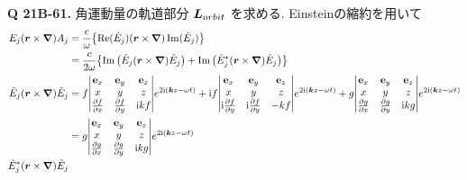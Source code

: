 \documentclass[uplatex,a4paper,dvipdfmx]{jsarticle}
\theoremstyle{definition}
\begin{document}
\textbf{Q 21B-61.}
角運動量の軌道部分 $\vb*{L}_{orbit}$ を求める. Einsteinの縮約を用いて
\begin{align}
  E_j(\rr\times\vnabla)A_j
                    & = \frac{c}{\omega}\qty{\Re(\Et_j)(\rr\times\vnabla)\Im(\Et_j)}                                                                                                                                                                                                                                       \\
                    & = \frac{c}{2\omega}\qty{\Im\qty(\Et_j(\rr\times\vnabla)\Et_j) + \Im\qty(\Et_j^*(\rr\times\vnabla)\Et_j)}                                                                                                                                                                                             \\
  \Et_j(\rr\times\vnabla)\Et_j
                    & = f\mqty|\vb{e}_x                                                                                                                                                                                                                                                              & \vb{e}_y & \vb{e}_z \\ x & y & z \\ \pdv{f}{x} & \pdv{f}{y} & \ii kf | e^{2\ii(\kk z-\omega t)} + \ii f\mqty|\vb{e}_x                                                                                        & \vb{e}_y & \vb{e}_z \\ x & y & z \\ \ii\pdv{f}{y} & \ii\pdv{f}{y} & -kf | e^{2\ii(\kk z-\omega t)} + g\mqty|\vb{e}_x                                                                                        & \vb{e}_y & \vb{e}_z \\ x & y & z \\ \pdv{g}{x} & \pdv{g}{y} & \ii kg | e^{2\ii(\kk z-\omega t)} \\
                    & = g\mqty|\vb{e}_x                                                                                                                                                                                                                                                              & \vb{e}_y & \vb{e}_z \\ x & y & z \\ \pdv{g}{x} & \pdv{g}{y} & \ii kg | e^{2\ii(\kk z-\omega t)} \\
  \Et_j^*(\rr\times\vnabla)\Et_j

\end{align}
\end{document}
